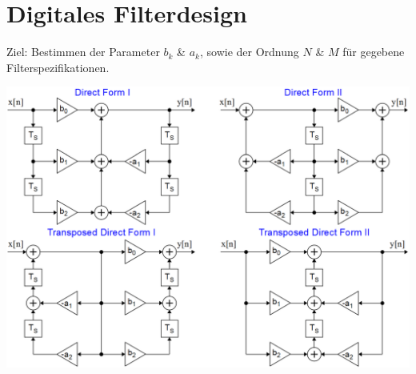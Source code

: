 


\chapter{Digitales Filterdesign}
Ziel: Bestimmen der Parameter $b_k$ \& $a_k$, sowie der Ordnung $N$ \& $M$ für gegebene Filterspezifikationen.
\begin{center}
	\includegraphics[width=.7\textwidth]{../fig/lti_scheme}
\end{center}

